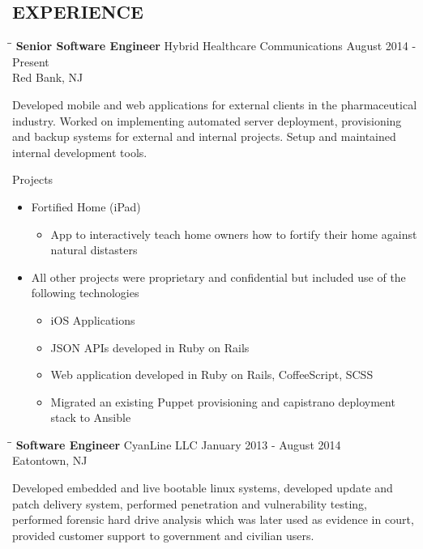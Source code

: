 \documentclass{res}
\begin{document}
\begin{resume}
\section{EXPERIENCE}
   \begin{tabbing}
   \hspace{2.3in}\= \hspace{2.6in}\= \kill %
    {\bf Senior Software Engineer} \>Hybrid Healthcare Communications     \>August 2014 - Present\\
                             \>Red Bank, NJ
   \end{tabbing}\vspace{-20pt}      %
    Developed mobile and web applications for external clients in the pharmaceutical industry.
    Worked on implementing automated server deployment, provisioning and backup systems for external and internal projects.
    Setup and maintained internal development tools.

    Projects
    \begin{itemize}
        \item Fortified Home (iPad)
        \begin{itemize}
          \item App to interactively teach home owners how to fortify their home against natural distasters
        \end{itemize}
        \item All other projects were proprietary and confidential but included use of the following technologies
        \begin{itemize}
            \item iOS Applications
            \item JSON APIs developed in Ruby on Rails
            \item Web application developed in Ruby on Rails, CoffeeScript, SCSS
            \item Migrated an existing Puppet provisioning and capistrano deployment stack to Ansible
        \end{itemize}
    \end{itemize}

   \begin{tabbing}
   \hspace{2.3in}\= \hspace{2.6in}\= \kill %
    {\bf Software Engineer} \>CyanLine LLC     \>January 2013 - August 2014\\
                             \>Eatontown, NJ
   \end{tabbing}\vspace{-20pt}      %
    Developed embedded and live bootable linux systems, 
    developed update and patch delivery system,
    performed penetration and vulnerability testing,
    performed forensic hard drive analysis which was later used as evidence in court,
    provided customer support to government and civilian users.


\end{resume}
\end{document}
